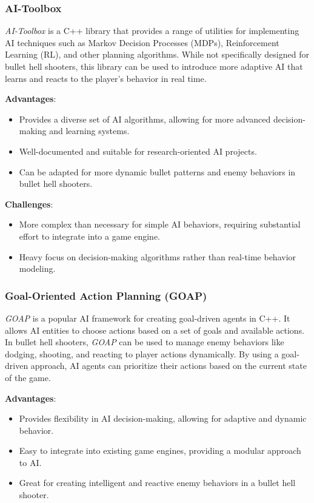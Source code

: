 \subsubsection{AI-Toolbox}

\textit{AI-Toolbox} is a C++ library that provides a range of utilities for implementing AI techniques such as Markov Decision Processes (MDPs), Reinforcement Learning (RL), and other planning algorithms. While not specifically designed for bullet hell shooters, this library can be used to introduce more adaptive AI that learns and reacts to the player’s behavior in real time.

\textbf{Advantages}:
\begin{itemize}
    \item Provides a diverse set of AI algorithms, allowing for more advanced decision-making and learning systems.
    \item Well-documented and suitable for research-oriented AI projects.
    \item Can be adapted for more dynamic bullet patterns and enemy behaviors in bullet hell shooters.
\end{itemize}

\textbf{Challenges}:
\begin{itemize}
    \item More complex than necessary for simple AI behaviors, requiring substantial effort to integrate into a game engine.
    \item Heavy focus on decision-making algorithms rather than real-time behavior modeling.
\end{itemize}

\subsubsection{Goal-Oriented Action Planning (GOAP)}

\textit{GOAP} is a popular AI framework for creating goal-driven agents in C++. It allows AI entities to choose actions based on a set of goals and available actions. In bullet hell shooters, \textit{GOAP} can be used to manage enemy behaviors like dodging, shooting, and reacting to player actions dynamically. By using a goal-driven approach, AI agents can prioritize their actions based on the current state of the game.

\textbf{Advantages}:
\begin{itemize}
    \item Provides flexibility in AI decision-making, allowing for adaptive and dynamic behavior.
    \item Easy to integrate into existing game engines, providing a modular approach to AI.
    \item Great for creating intelligent and reactive enemy behaviors in a bullet hell shooter.
\end{itemize}

